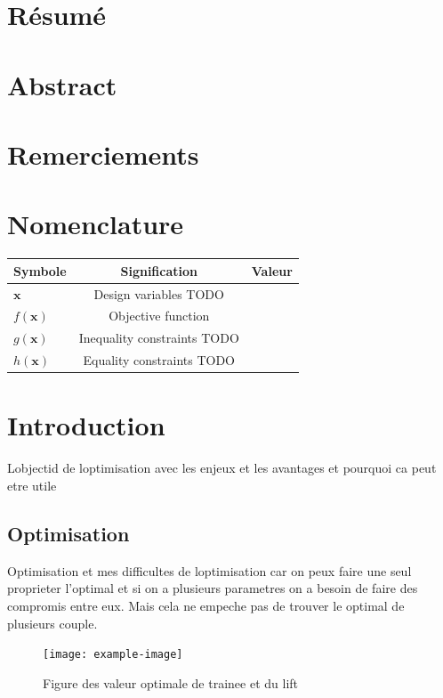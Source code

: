 \documentclass[12pt, a4paper]{article}%
\begin{document}
\section*{Résumé}{
}
\section*{Abstract}{
}
\section*{Remerciements}{
}
\newpage

\tableofcontents
\newpage
\listoffigures
\listoftables
\newpage

\section*{Nomenclature}{
\begin{table}[H]
    \begin{tabular}{l c c} %
        \toprule
        Symbole & Signification & Valeur \\
        \midrule
        $\bm{x}$ & Design variables TODO& \\
        $f(\bm{x})$ & Objective function & \\
        $g(\bm{x})$ & Inequality constraints TODO& \\
        $h(\bm{x})$ & Equality constraints TODO& \\
        \bottomrule
    \end{tabular}
\end{table}
      
}

\newpage

\newpage    
{}


\section{Introduction}
Lobjectid de loptimisation avec les enjeux et les avantages et pourquoi ca peut etre utile
\subsection{Optimisation}
Optimisation et mes difficultes de loptimisation car on peux faire une seul proprieter l'optimal et si on a plusieurs parametres on a besoin de faire des compromis entre eux. Mais cela ne empeche pas de trouver le optimal de plusieurs couple. 
\begin{figure}[H]
    \centering
    \texttt{[image: example-image]}
    \caption{Figure des valeur optimale de trainee et du lift}
\end{figure}
\end{document}
